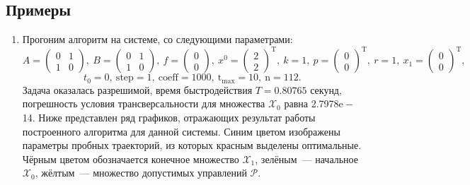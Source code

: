 \documentclass[a4paper,11pt]{article}
\begin{document}
\subsection{Примеры}
\begin{enumerate}
\item Прогоним алгоритм на системе, со следующими параметрами: 
\[
A = \begin{pmatrix}
  0 & 1 \\
  1 & 0
\end{pmatrix}, \ 
B = \begin{pmatrix} 
  0 & 1 \\
  1 & 0
\end{pmatrix}, \ 
f = \begin{pmatrix}
  0\\
  0
\end{pmatrix}, \ 
x^0 = \begin{pmatrix}
  2\\
  2
\end{pmatrix}^\mathrm{T}, \ 
k = 1,  \ 
p = \begin{pmatrix}
  0\\
  0
\end{pmatrix}^\mathrm{T}, \ 
r = 1, \ 
x_1 = \begin{pmatrix}
  0\\
  0
\end{pmatrix}^\mathrm{T},\] 
\[ t_0 = 0, \  \mathrm{step} = 1, \  \mathrm{coeff} = 1000, \  \mathrm{t_{max}} = 10, \ \mathrm{n} = 112.\]
Задача оказалась разрешимой, время быстродействия $T = 0.80765$ секунд, погрешность условия трансверсальности для множества $\mathcal{X}_0$ равна 2.7978$\mathrm{e-}$14. Ниже представлен ряд графиков, отражающих результат работы построенного алгоритма для данной системы. Синим цветом изображены параметры пробных траекторий, из которых красным выделены оптимальные. Чёрным цветом обозначается конечное множество $\mathcal{X}_1$, зелёным~--- начальное $\mathcal{X}_0$, жёлтым~--- множество допустимых управлений $\mathcal{P}$. 


\end{enumerate}
\end{document}
